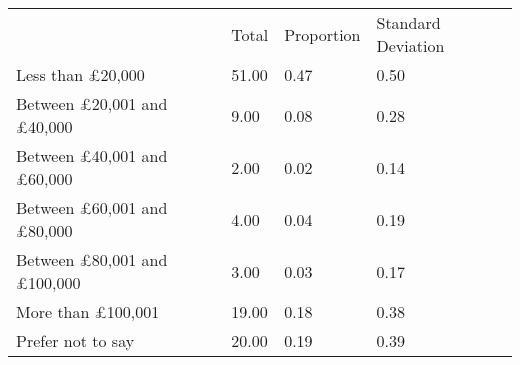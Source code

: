 \documentclass{article}
\begin{document}
\begin{table}[!h]
\centering
\begin{tabular}{llll}
\cline{1-4}
\multicolumn{1}{|l}{} &
  \multicolumn{1}{|l}{Total} &
  \multicolumn{1}{|l}{Proportion} &
  \multicolumn{1}{|l|}{Standard Deviation} \\
\cline{1-4}
\multicolumn{1}{|l}{Less than £20,000} &
  \multicolumn{1}{|l}{51.00} &
  \multicolumn{1}{|l}{0.47} &
  \multicolumn{1}{|l|}{0.50} \\
\cline{1-4}
\multicolumn{1}{|l}{Between £20,001 and £40,000} &
  \multicolumn{1}{|l}{9.00} &
  \multicolumn{1}{|l}{0.08} &
  \multicolumn{1}{|l|}{0.28} \\
\cline{1-4}
\multicolumn{1}{|l}{Between £40,001 and £60,000} &
  \multicolumn{1}{|l}{2.00} &
  \multicolumn{1}{|l}{0.02} &
  \multicolumn{1}{|l|}{0.14} \\
\cline{1-4}
\multicolumn{1}{|l}{Between £60,001 and £80,000} &
  \multicolumn{1}{|l}{4.00} &
  \multicolumn{1}{|l}{0.04} &
  \multicolumn{1}{|l|}{0.19} \\
\cline{1-4}
\multicolumn{1}{|l}{Between £80,001 and £100,000} &
  \multicolumn{1}{|l}{3.00} &
  \multicolumn{1}{|l}{0.03} &
  \multicolumn{1}{|l|}{0.17} \\
\cline{1-4}
\multicolumn{1}{|l}{More than £100,001} &
  \multicolumn{1}{|l}{19.00} &
  \multicolumn{1}{|l}{0.18} &
  \multicolumn{1}{|l|}{0.38} \\
\cline{1-4}
\multicolumn{1}{|l}{Prefer not to say} &
  \multicolumn{1}{|l}{20.00} &
  \multicolumn{1}{|l}{0.19} &
  \multicolumn{1}{|l|}{0.39} \\
\cline{1-4}
\end{tabular}
\end{table}
\end{document}
